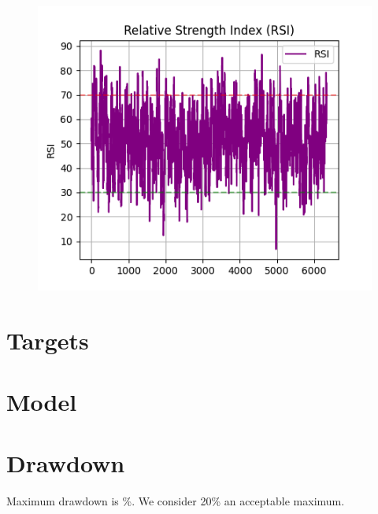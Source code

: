 \documentclass[a4paper]{article}
\begin{document}
\begin{figure}[H]
    \begin{center}
        \includegraphics{../generated/feature_RSI.png}
    \end{center}
\end{figure}

\section{Targets}

\section{Model}

\section{Drawdown}

Maximum drawdown is \constantMaxdrawdown \%. We consider 20\% an acceptable maximum.
\end{document}
